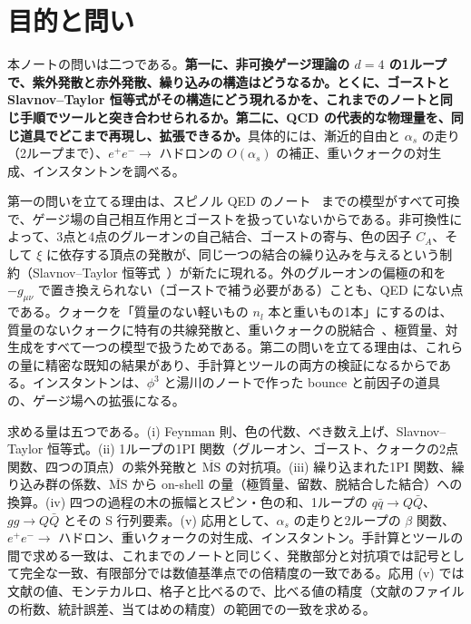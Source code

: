 \documentclass[a4paper,10pt]{ltjsarticle}
\newcommand{\MSbar}{\overline{\mathrm{MS}}}
\begin{document}
\tableofcontents

\section{目的と問い}\label{sec:intro}

本ノートの問いは二つである。\textbf{第一に、非可換ゲージ理論の $d=4$ の1ループで、紫外発散と赤外発散、繰り込みの構造はどうなるか。とくに、ゴーストと Slavnov--Taylor 恒等式がその構造にどう現れるかを、これまでのノートと同じ手順でツールと突き合わせられるか。第二に、QCD の代表的な物理量を、同じ道具でどこまで再現し、拡張できるか。}具体的には、漸近的自由と $\alpha_s$ の走り（2ループまで）、$e^+e^-\to$ ハドロンの $O(\alpha_s)$ の補正、重いクォークの対生成、インスタントンを調べる。

第一の問いを立てる理由は、スピノル QED のノート~\cite{qednote} までの模型がすべて可換で、ゲージ場の自己相互作用とゴーストを扱っていないからである。非可換性によって、3点と4点のグルーオンの自己結合、ゴーストの寄与、色の因子 $C_A$、そして $\xi$ に依存する頂点の発散が、同じ一つの結合の繰り込みを与えるという制約（Slavnov--Taylor 恒等式~\cite{slavnov,taylor}）が新たに現れる。外のグルーオンの偏極の和を $-g_{\mu\nu}$ で置き換えられない（ゴーストで補う必要がある）ことも、QED にない点である。クォークを「質量のない軽いもの $n_l$ 本と重いもの1本」にするのは、質量のないクォークに特有の共線発散と、重いクォークの脱結合~\cite{ac75}、極質量、対生成をすべて一つの模型で扱うためである。第二の問いを立てる理由は、これらの量に精密な既知の結果があり、手計算とツールの両方の検証になるからである。インスタントンは、$\phi^3$ と湯川のノートで作った bounce と前因子の道具の、ゲージ場への拡張になる。

求める量は五つである。(i) Feynman 則、色の代数、べき数え上げ、Slavnov--Taylor 恒等式。(ii) 1ループの1PI 関数（グルーオン、ゴースト、クォークの2点関数、四つの頂点）の紫外発散と $\MSbar$ の対抗項。(iii) 繰り込まれた1PI 関数、繰り込み群の係数、$\MSbar$ から on-shell の量（極質量、留数、脱結合した結合）への換算。(iv) 四つの過程の木の振幅とスピン・色の和、1ループの $q\bar q\to Q\bar Q$、$gg\to Q\bar Q$ とその S 行列要素。(v) 応用として、$\alpha_s$ の走りと2ループの $\beta$ 関数、$e^+e^-\to$ ハドロン、重いクォークの対生成、インスタントン。手計算とツールの間で求める一致は、これまでのノートと同じく、発散部分と対抗項では記号として完全な一致、有限部分では数値基準点での倍精度の一致である。応用 (v) では文献の値、モンテカルロ、格子と比べるので、比べる値の精度（文献のファイルの桁数、統計誤差、当てはめの精度）の範囲での一致を求める。
\end{document}
